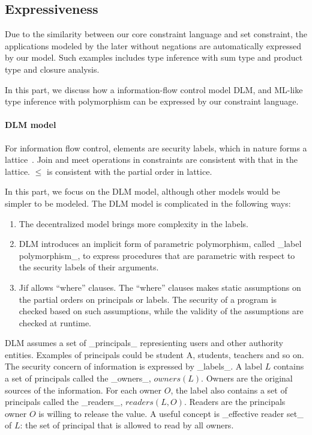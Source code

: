 \subsection{Expressiveness}

Due to the similarity between our core constraint language and set
constraint, the applications modeled by the later without negations
are automatically expressed by our model. Such examples includes type
inference with sum type and product type and closure analysis.

In this part, we discuss how a information-flow control model DLM, and ML-like
type inference with polymorphism can be expressed by our constraint language.

\paragraph{DLM model}

For information flow control, elements are security labels, which in
nature forms a lattice~\cite{denning-lattice}. Join and meet
operations in constraints are consistent with that in the lattice.
$\leq$ is consistent with the partial order in lattice.
 
In this part, we focus on the DLM model, although other models would be simpler
to be modeled. The DLM model is complicated in the following ways:

\begin{enumerate}
\item The decentralized model brings more complexity in the labels.

\item DLM introduces an implicit form of parametric polymorphism, called _label
polymorphism_, to express procedures that are parametric with respect to the
security labels of their arguments.

\item Jif allows ``where'' clauses. The ``where'' clauses makes static
assumptions on the partial orders on principals or labels. The security of a
program is checked based on such assumptions, while the validity of the
assumptions are checked at runtime. 
\end{enumerate}

DLM assumes a set of _principals_ represienting users and other
authority entities. Examples of principals could be student A,
students, teachers and so on. The security concern of information is
expressed by _labels_. A label $L$ contains a set of principals called
the _owners_, $owners(L)$. Owners are the original sources of the
information. For each owner $O$, the label also contains a set of
principals called the _readers_, $readers(L,O)$. Readers are the
principals owner $O$ is willing to release the value. A useful concept
is _effective reader set_ of $L$: the set of principal that is allowed
to read by all owners.

